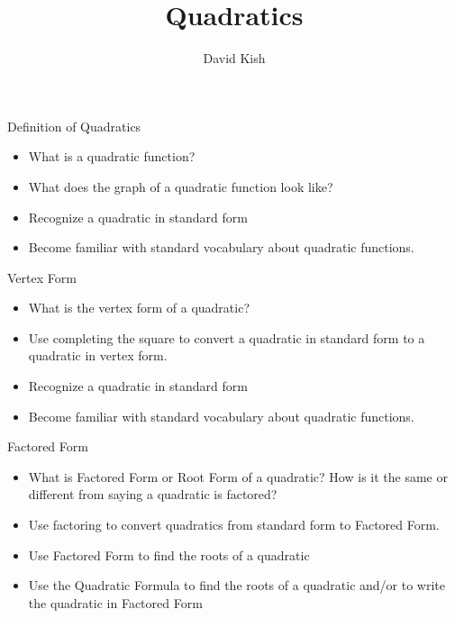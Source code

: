 \documentclass{ximera}
\author{David Kish}
\title{Quadratics}
\begin{document}
\begin{abstract}
\end{abstract}
\maketitle


\begin{objectives}

\item Definition of Quadratics
\begin{itemize}
	\item What is a quadratic function?  
	\item What does the graph of a quadratic function look like?
	\item Recognize a quadratic in standard form
	\item Become familiar with standard vocabulary about quadratic functions.
\end{itemize}

\item Vertex Form
\begin{itemize}
	\item What is the vertex form of a quadratic?
	\item Use completing the square to convert a quadratic in standard form to a quadratic in vertex form.
	\item Recognize a quadratic in standard form
	\item Become familiar with standard vocabulary about quadratic functions.
\end{itemize}

\item Factored Form
\begin{itemize}
	\item What is Factored Form or Root Form of a quadratic?  How is it the same or different from saying a quadratic is factored?
	\item Use factoring to convert quadratics from standard form to Factored Form.
	\item Use Factored Form to find the roots of a quadratic
	\item Use the Quadratic Formula to find the roots of a quadratic and/or to write the quadratic in Factored Form
\end{itemize}

\end{objectives}
\end{document}

